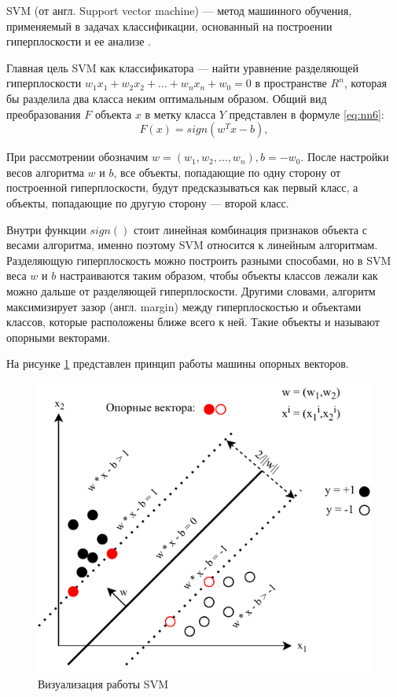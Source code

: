 SVM (от англ. Support vector machine) --- метод машинного обучения, применяемый в задачах классификации, основанный на построении гиперплоскости и ее анализе \cite{svm}.

Главная цель SVM как классификатора --- найти уравнение разделяющей гиперплоскости $w_1x_1+w_2x_2+…+w_nx_n+w_0=0$ в пространстве $R^n$, которая бы разделила два класса неким оптимальным образом. Общий вид преобразования $F$ объекта $x$ в метку класса $Y$ представлен в формуле \ref{eq:nn6}: 
\begin{equation}
	\label{eq:nn6}
	F(x) = sign(w^Tx-b),
\end{equation}

При рассмотрении обозначим $w = (w_1, w_2, …, w_n), b=-w_0$. После настройки весов алгоритма $w$ и $b$, все объекты, попадающие по одну сторону от построенной гиперплоскости, будут предсказываться как первый класс, а объекты, попадающие по другую сторону --- второй класс.

Внутри функции $sign()$ стоит линейная комбинация признаков объекта с весами алгоритма, именно поэтому SVM относится к линейным алгоритмам. Разделяющую гиперплоскость можно построить разными способами, но в SVM веса $w$ и $b$ настраиваются таким образом, чтобы объекты классов лежали как можно дальше от разделяющей гиперплоскости. Другими словами, алгоритм максимизирует зазор (англ. margin) между гиперплоскостью и объектами классов, которые расположены ближе всего к ней. Такие объекты и называют опорными векторами.

На рисунке \ref{fig:svm1} представлен принцип работы машины опорных векторов.

\begin{figure}[H]
	\centering
	\includegraphics[width=\textwidth]{img/svm1.pdf}
	\caption{Визуализация работы SVM}
	\label{fig:svm1}
\end{figure}

